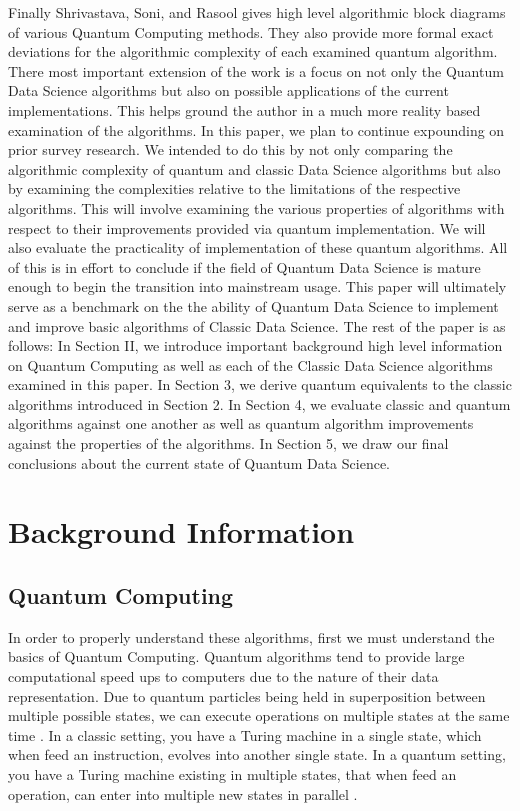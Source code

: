 \documentclass[conference]{IEEEtran}
\begin{document}
\newline
\indent Finally Shrivastava, Soni, and Rasool gives high level algorithmic block diagrams of various Quantum Computing methods. They also provide more formal exact deviations for the algorithmic complexity of each examined quantum algorithm. There most important extension of the work is a focus on not only the Quantum Data Science algorithms but also on possible applications of the current implementations. This helps ground the author in a much more reality based examination of the algorithms.\cite{b8}    
\newline
\indent In this paper, we plan to continue expounding on prior survey research. We intended to do this by not only comparing the algorithmic complexity of quantum and classic Data Science algorithms but also by examining the complexities relative to the limitations of the respective algorithms. This will involve examining the various properties of algorithms with respect to their improvements provided via quantum implementation. We will also evaluate the practicality of implementation of these quantum algorithms. All of this is in effort to conclude if the field of Quantum Data Science is mature enough to begin the transition into mainstream usage. 
\newline
\indent This paper will ultimately serve as a benchmark on the the ability of Quantum Data Science to implement and improve basic algorithms of Classic Data Science. The rest of the paper is as follows: In Section II, we introduce important background high level information on Quantum Computing as well as each of the Classic Data Science algorithms examined in this paper. In Section 3, we derive quantum equivalents to the classic algorithms introduced in Section 2. In Section 4, we evaluate classic and quantum algorithms against one another as well as quantum algorithm improvements against the properties of the algorithms. In Section 5, we draw our final conclusions about the current state of Quantum Data Science.    
\section{Background Information}

\subsection{Quantum Computing}
In order to properly understand these algorithms, first we must understand the basics of Quantum Computing. Quantum algorithms tend to provide large computational speed ups to computers due to the nature of their data representation. Due to quantum particles being held in superposition between multiple possible states, we can execute operations on multiple states at the same time \cite{b5}. In a classic setting, you have a Turing machine in a single state, which when feed an instruction, evolves into another single state. In a quantum setting, you have a Turing machine existing in multiple states, that when feed an operation, can enter into multiple new states in parallel \cite{b9}.   
\end{document}
